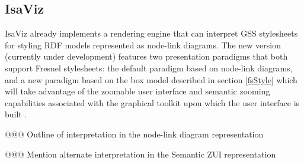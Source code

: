 \subsection{IsaViz}

IsaViz \cite{isaviz} already implements a rendering engine that can interpret GSS style\-sheets \cite{Pietriga03} for styling RDF models represented as node-link diagrams. The new version (currently under development) features two presentation paradigms that both support Fresnel stylesheets: the default paradigm based on node-link diagrams, and a new paradigm based on the box model described in section \ref{fsStyle} which will take advantage of the zoomable user interface and semantic zooming capabilities associated with the graphical toolkit upon which the user interface is built \cite{Pietriga05a}.

@@@ Outline of interpretation in the node-link diagram representation

@@@ Mention alternate interpretation in the Semantic ZUI representation
